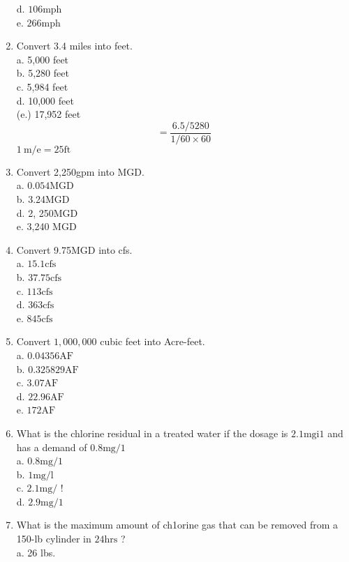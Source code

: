 \begin{enumerate}
d. $106 \mathrm{mph}$\\
e. $266 \mathrm{mph}$\\
\item Convert 3.4 miles into feet.\\
a. 5,000 feet\\
b. 5,280 feet\\
c. 5,984 feet\\
d. 10,000 feet\\
(e.) 17,952 feet\\
$$
=\frac{6.5 / 5280}{1 / 60 \times 60}
$$
$1 \mathrm{~m} / \mathrm{e}=25 \mathrm{ft}$\\
\item Convert 2,250gpm into MGD.\\
a. $0.054 \mathrm{MGD}$\\
b. 3.24MGD\\
d. 2, 250MGD\\
e. 3,240 MGD\\
\item Convert 9.75MGD into cfs.\\
a. $15.1 \mathrm{cfs}$\\
b. $37.75 \mathrm{cfs}$\\
c. $113 \mathrm{cfs}$\\
d. $363 \mathrm{cfs}$\\
e. $845 \mathrm{cfs}$\\
\item Convert $1,000,000$ cubic feet into Acre-feet.\\
a. $0.04356 \mathrm{AF}$\\
b. $0.325829 \mathrm{AF}$\\
c. $3.07 \mathrm{AF}$\\
d. $22.96 \mathrm{AF}$\\
e. $172 \mathrm{AF}$\\
\item What is the chlorine residual in a treated water if the dosage is $2.1 \mathrm{mgi} 1$ and has a demand of $0.8 \mathrm{mg} / 1$\\
a. $0.8 \mathrm{mg} / 1$\\
b. $1 \mathrm{mg} / \mathrm{l}$\\
c. $2.1 \mathrm{mg} /$ !\\
d. $2.9 \mathrm{mg} / 1$\\
\item What is the maximum amount of ch1orine gas that can be removed from a 150-lb cylinder in $24 \mathrm{hrs}$ ?\\
a. 26 lbs.\\

\end{enumerate}
